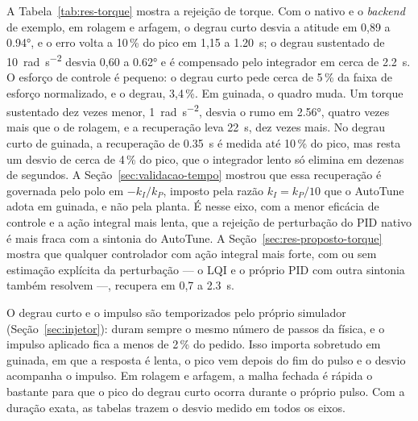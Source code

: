 A Tabela~\ref{tab:res-torque} mostra a rejeição de torque. Com o nativo e o
\textit{backend} de exemplo, em rolagem e
arfagem, o degrau curto desvia a atitude em 0,89 a \ang{0.94}, e o erro volta
a 10\,\% do pico em 1,15 a \SI{1.20}{\second}; o degrau sustentado de
\SI{10}{\radian\per\second\squared} desvia 0,60 a \ang{0.62} e é compensado
pelo integrador em cerca de \SI{2.2}{\second}. O esforço de controle é
pequeno: o degrau curto pede cerca de 5\,\% da faixa de esforço normalizado,
e o degrau, 3,4\,\%. Em guinada, o quadro muda. Um torque sustentado dez vezes menor,
\SI{1}{\radian\per\second\squared}, desvia o rumo em \ang{2.56}, quatro vezes
mais que o de rolagem, e a recuperação leva \SI{22}{\second}, dez vezes mais.
No degrau curto de guinada, a recuperação de \SI{0.35}{\second} é medida
até 10\,\% do pico, mas resta um desvio de cerca de 4\,\% do pico, que o
integrador lento só elimina em dezenas de segundos. A Seção~\ref{sec:validacao-tempo} mostrou que essa recuperação é governada
pelo polo em $-k_I/k_P$, imposto pela razão $k_I = k_P/10$ que o AutoTune
adota em guinada, e não pela planta. É nesse eixo, com a menor eficácia de
controle e a ação integral mais lenta, que a rejeição de perturbação do PID
nativo é mais fraca com a sintonia do AutoTune. A
Seção~\ref{sec:res-proposto-torque} mostra que qualquer controlador com ação
integral mais forte, com ou sem estimação explícita da perturbação --- o LQI
e o próprio PID com outra sintonia também resolvem ---, recupera em 0,7 a
\SI{2.3}{\second}.

O degrau curto e o impulso são temporizados pelo próprio simulador
(Seção~\ref{sec:injetor}): duram sempre o mesmo número de passos da física,
e o impulso aplicado fica a menos de 2\,\% do pedido. Isso importa sobretudo
em guinada, em que a resposta é lenta, o pico vem depois do fim do pulso e
o desvio acompanha o impulso. Em rolagem e arfagem, a malha fechada é rápida
o bastante para que o pico do degrau curto ocorra durante o próprio pulso.
Com a duração exata, as tabelas trazem o desvio medido em todos os eixos.

\begin{table}[htbp]
\centering
\caption{Rejeição de torque com o PID nativo, no ensaio de cada eixo e no
ensaio simultâneo dos três eixos.}
\label{tab:res-simultaneo}
\small


\nota{\raggedright }
\end{table}


